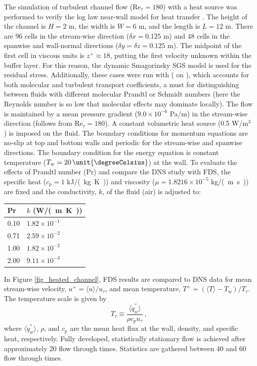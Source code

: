 \documentclass[11pt]{book}
\begin{document}
The simulation of turbulent channel flow (Re$_{\tau}=180$) with a heat source was performed to verify the log law near-wall model for heat transfer \cite{FDS_Tech_Guide}. The height of the channel is $H=2$ m, the width is $W=6$ m, and the length is $L=12$ m. There are 96 cells in the stream-wise direction ($\delta x = 0.125$ m) and 48 cells in the spanwise and wall-normal directions ($\delta y=\delta z=0.125$ m).  The midpoint of the first cell in viscous units is $z^+ \approx 18$, putting the first velocity unknown within the buffer layer. For this reason, the dynamic Smagorinsky SGS model is used for the residual stress. Additionally, these cases were run with ( on ), which accounts for both molecular and turbulent transport coefficients, a must for distinguishing between fluids with different molecular Prandtl or Schmidt numbers (here the Reynolds number is so low that molecular effects may dominate locally).  The flow is maintained by a mean pressure gradient ($9.0 \times 10^{-6}$ Pa/m) in the stream-wise direction (follows from Re$_{\tau}=180$). A constant volumetric heat source (0.5 W/m$^3$) is imposed on the fluid. The boundary conditions for momentum equations are no-slip at top and bottom walls and periodic for the stream-wise and spanwise directions. The boundary condition for the energy equation is constant temperature ($T_w = 20 \,\mbox{\unit{\degreeCelsius}} $) at the wall. To evaluate the effects of Prandtl number (Pr) and compare the DNS study \cite{Kim:1987} with FDS, the specific heat ($c_p = 1$ \unit{kJ/(kg.K)}) and viscosity ($\mu = 1.8216 \times 10^{-5}$ \unit{kg/(m.s)}) are fixed and the conductivity, $k$, of the fluid (air) is adjusted to:
\begin{center}
\begin{tabular}{ll}
Pr & $k$ (\unit{W/(m.K)}) \\
\hline
0.10 & $1.82 \times 10^{-1}$ \\
0.71 & $2.59 \times 10^{-2}$ \\
1.00 & $1.82 \times 10^{-2}$ \\
2.00 & $9.11 \times 10^{-3}$
\end{tabular}
\end{center}

In Figure \ref{fig_heated_channel}, FDS results are compared to DNS data for mean stream-wise velocity, $u^+ = \langle u \rangle/u_\tau$, and mean temperature, $T^+ = (\langle T \rangle - T_w)/T_\tau$. The temperature scale is given by
\begin{equation}
\label{eqn_friction_temperature}
T_{\tau} \equiv \frac{\langle \dot{q}_w^{''} \rangle}{{\rho}{c_p}{u_{\tau}}} \,\mbox{,}
\end{equation}
where $\langle \dot{q}_w^{''} \rangle$, $\rho$, and $c_p$ are the mean heat flux at the wall, density, and specific heat, respectively.  Fully developed, statistically stationary flow is achieved after approximately 20 flow through times.  Statistics are gathered between 40 and 60 flow through times.
\end{document}
